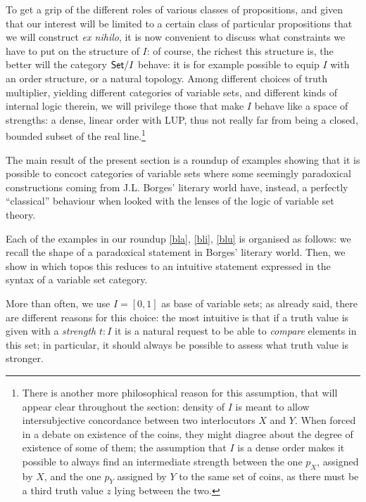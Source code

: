 \begin{remark}\label{something_on_I}
To get a grip of the different roles of various classes of propositions, and given that our interest will be limited to a certain class of particular propositions that we will construct \emph{ex nihilo}, it is now convenient to discuss what constraints we have to put on the structure of $I$: of course, the richest this structure is, the better will the category $\mathsf{Set}/I$ behave: it is for example possible to equip $I$ with an order structure, or a natural topology. Among different choices of truth multiplier, yielding different categories of variable sets, and different kinds of internal logic therein, we will privilege those that make $I$ behave like a space of strengths: a dense, linear order with LUP, thus not really far from being a closed, bounded subset of the real line.\footnote{There is another more philosophical reason for this assumption, that will appear clear throughout the section: density of $I$ is meant to allow intersubjective concordance between two interlocutors $X$ and $Y$. When forced in a debate on existence of the coins, they might diagree about the degree of existence of some of them; the assumption that $I$ is a dense order makes it possible to always find an intermediate strength between the one $p_X$, assigned by $X$, and the one $p_Y$ assigned by $Y$ to the same set of coins, as there must be a third truth value $z$ lying between the two.}
\end{remark}
The main result of the present section is a roundup of examples showing that it is possible to concoct categories of variable sets where some seemingly paradoxical constructions coming from J.L. Borges' literary world have, instead, a perfectly ``classical'' behaviour when looked with the lenses of the logic of variable set theory.

Each of the examples in our roundup \autoref{bla}, \ref{bli}, \ref{blu} is organised as follows: we recall the shape of a paradoxical statement in Borges' literary world. Then, we show in which topos this reduces to an intuitive statement expressed in the syntax of a variable set category.

More than often, we use $I=[0,1]$ as base of variable sets; as already said, there are different reasons for this choice: the most intuitive is that if a truth value is given with a \emph{strength} $t: I$ it is a natural request to be able to \emph{compare} elements in this set; in particular, it should always be possible to assess what truth value is stronger.

